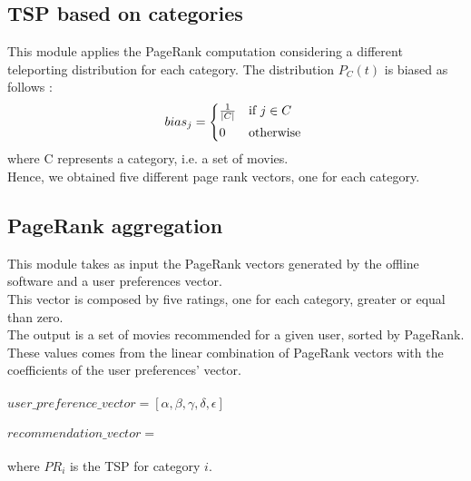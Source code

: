 \documentclass[11pt]{article}
\begin{document}
\subsection{TSP based on categories}
This module applies the PageRank computation considering a different teleporting distribution for each category. The
distribution $P_{C}(t)$ is biased as follows :
\begin{equation}
    bias_{j} =
    \begin{cases*}
      \frac{1}{|C|} & if $j \in C$ \\
      0        & otherwise
    \end{cases*}
  \end{equation}
where C represents a category, i.e. a set of movies.\\
Hence, we obtained five different page rank vectors, one for each category.

\subsection{PageRank aggregation}
This module takes as input the PageRank vectors generated by the offline software and a user preferences vector.\\
This vector is composed by five ratings, one for each category, greater or equal than zero.\\
The output is a set of movies recommended for a given user, sorted by PageRank.\\ 
These values comes from the linear combination of PageRank vectors with the coefficients of the user preferences'
vector.\\ 
\\
$user\_preference\_vector = [\alpha, \beta, \gamma, \delta, \epsilon]$\\
\\
$recommendation\_vector =$ \\
 \\
 where $PR_i$ is the TSP for category $i$.\\
\end{document}
